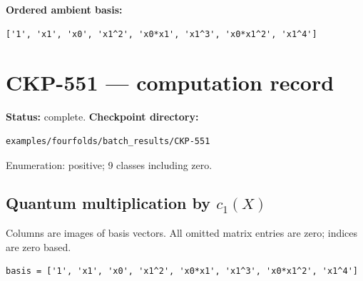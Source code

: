 \documentclass[10pt,a4paper]{article}
\begin{document}
\textbf{Ordered ambient basis:}
\begin{lstlisting}
['1', 'x1', 'x0', 'x1^2', 'x0*x1', 'x1^3', 'x0*x1^2', 'x1^4']
\end{lstlisting}

\clearpage\section*{CKP-551 --- computation record}
\textbf{Status:} complete.
\textbf{Checkpoint directory:}
\begin{lstlisting}
examples/fourfolds/batch_results/CKP-551
\end{lstlisting}

Enumeration: positive; 9 classes including zero.
\subsection*{Quantum multiplication by $c_1(X)$}
Columns are images of basis vectors. All omitted matrix entries are zero; indices are zero based.

\begin{lstlisting}
basis = ['1', 'x1', 'x0', 'x1^2', 'x0*x1', 'x1^3', 'x0*x1^2', 'x1^4']
\end{lstlisting}
\end{document}
